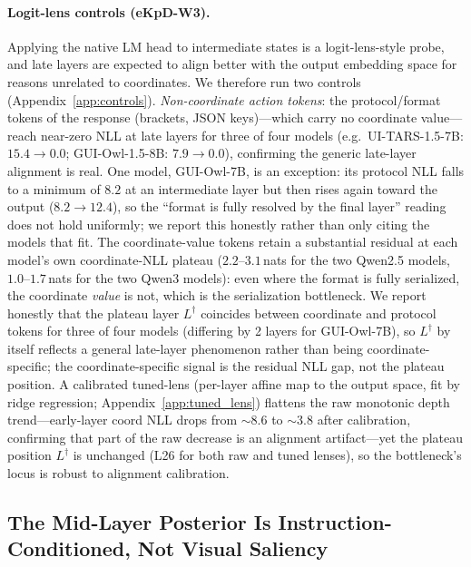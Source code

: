 \paragraph{Logit-lens controls (eKpD-W3).}
Applying the native LM head to intermediate states is a logit-lens-style probe, and late layers are expected to align better with the output embedding space for reasons unrelated to coordinates.
We therefore run two controls (Appendix~\ref{app:controls}).
\emph{Non-coordinate action tokens}: the protocol/format tokens of the response (brackets, JSON keys)---which carry no coordinate value---reach near-zero NLL at late layers for three of four models (e.g.\ UI-TARS-1.5-7B: $15.4 \to 0.0$; GUI-Owl-1.5-8B: $7.9 \to 0.0$), confirming the generic late-layer alignment is real.
One model, GUI-Owl-7B, is an exception: its protocol NLL falls to a minimum of $8.2$ at an intermediate layer but then rises again toward the output ($8.2 \to 12.4$), so the ``format is fully resolved by the final layer'' reading does not hold uniformly; we report this honestly rather than only citing the models that fit.
The coordinate-value tokens retain a substantial residual at each model's own coordinate-NLL plateau ($2.2$--$3.1$\,nats for the two Qwen2.5 models, $1.0$--$1.7$\,nats for the two Qwen3 models): even where the format is fully serialized, the coordinate \emph{value} is not, which is the serialization bottleneck.
We report honestly that the plateau layer $L^\dagger$ coincides between coordinate and protocol tokens for three of four models (differing by 2 layers for GUI-Owl-7B), so $L^\dagger$ by itself reflects a general late-layer phenomenon rather than being coordinate-specific; the coordinate-specific signal is the residual NLL gap, not the plateau position.
A calibrated tuned-lens (per-layer affine map to the output space, fit by ridge regression; Appendix~\ref{app:tuned_lens}) flattens the raw monotonic depth trend---early-layer coord NLL drops from $\sim$8.6 to $\sim$3.8 after calibration, confirming that part of the raw decrease is an alignment artifact---yet the plateau position $L^\dagger$ is unchanged (L26 for both raw and tuned lenses), so the bottleneck's locus is robust to alignment calibration.

\subsection{The Mid-Layer Posterior Is Instruction-Conditioned, Not Visual Saliency}
\label{sec:analysis:counterfactual}

